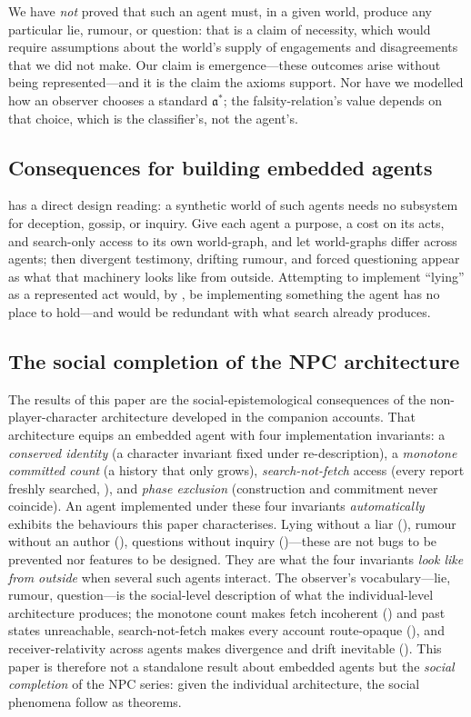 \documentclass[11pt,twocolumn,a4paper]{article}
\newcommand{\acct}{\mathfrak{a}}   %
\begin{document}
We have \emph{not} proved that such an agent must, in a given world, produce
any particular lie, rumour, or question: that is a claim of necessity, which
would require assumptions about the world's supply of engagements and
disagreements that we did not make. Our claim is emergence---these outcomes
arise without being represented---and it is the claim the axioms support.
Nor have we modelled how an observer chooses a standard $\acct^\ast$; the
falsity-relation's value depends on that choice, which is the classifier's,
not the agent's.

\subsection{Consequences for building embedded agents}

 has a direct design reading: a synthetic world of such
agents needs no subsystem for deception, gossip, or inquiry. Give each agent
a purpose, a cost on its acts, and search-only access to its own world-graph,
and let world-graphs differ across agents; then divergent testimony, drifting
rumour, and forced questioning appear as what that machinery looks like from
outside. Attempting to implement ``lying'' as a represented act would, by
, be implementing something the agent has no place
to hold---and would be redundant with what search already produces.

\subsection{The social completion of the NPC architecture}
\label{sec:npc}

The results of this paper are the social-epistemological consequences of the
non-player-character architecture developed in the companion accounts. That
architecture equips an embedded agent with four implementation
invariants: a \emph{conserved identity} (a character invariant fixed under
re-description), a \emph{monotone committed count} (a history that only
grows), \emph{search-not-fetch} access (every report freshly searched,
), and \emph{phase exclusion}
(construction and commitment never coincide). An agent implemented under
these four invariants \emph{automatically} exhibits the behaviours this
paper characterises. Lying without a liar (), rumour
without an author (), questions without inquiry
()---these are not bugs to be prevented nor features to be
designed. They are what the four invariants \emph{look like from outside}
when several such agents interact. The observer's vocabulary---lie, rumour,
question---is the social-level description of what the individual-level
architecture produces; the monotone count makes fetch incoherent
() and past states unreachable, search-not-fetch
makes every account route-opaque (), and
receiver-relativity across agents makes divergence and drift inevitable
(). This paper is therefore not a standalone
result about embedded agents but the \emph{social completion} of the NPC
series: given the individual architecture, the social phenomena follow as
theorems.
\end{document}
